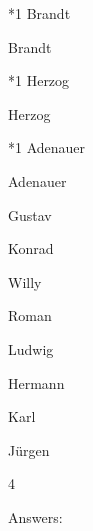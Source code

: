 \documentclass{article}
\newcommand{\presetMatch}{\Q{1}\AddAAKeystroke{event.change=event.change.toUpperCase();}\rectW{\widthof{AA}}}
\begin{document}
\begin{quiz*}{\currQuiz}
\begin{questions}
\begin{rtVW}
\begin{rtVWi}
   \RespBoxTxt[\presets{\presetMatch}\rectW{5mm}\MaxLen{1}]{0}{0}*{1}{} Brandt
   \begin{solution}
        Brandt
\end{solution}
\end{rtVWi}
\begin{rtVWi}
   \RespBoxTxt[\presets{\presetMatch}\rectW{5mm}\MaxLen{1}]{0}{0}*{1}{} Herzog
   \begin{solution}
        Herzog
\end{solution}
\end{rtVWi}
\begin{rtVWi}
   \RespBoxTxt[\presets{\presetMatch}\rectW{5mm}\MaxLen{1}]{0}{0}*{1}{} Adenauer
   \begin{solution}
        Adenauer
\end{solution}
\end{rtVWi}
\eRTVToks
{}
\begin{rtVWi}
   Gustav
\end{rtVWi}
\begin{rtVWi}
   \label{konrad} Konrad
\end{rtVWi}
\begin{rtVWi}
   \label{willy} Willy
\end{rtVWi}
\begin{rtVWi}
   \label{roman} Roman
\end{rtVWi}
\begin{rtVWi}
   Ludwig
\end{rtVWi}
\begin{rtVWi}
   Hermann
\end{rtVWi}
\begin{rtVWi}
   Karl
\end{rtVWi}
\begin{rtVWi}
   J\"{u}rgen
\end{rtVWi}
\eRTVToks
    \begin{multicols}{4}
       \begin{questions}[labelwidthTo={\textbf{A}}]
           \hideCreditMarkup
           \renewcommand{\theeqquestionnoii}{\Alph{eqquestionnoii}}
           \showCreditMarkup
       \end{questions}
    \end{multicols}
    \begin{questions}
       \showCreditMarkup
    \end{questions}
\end{rtVW}
  \eRTVToks
  \displayListRandomly{\thisQuiz}
\end{questions}
\end{quiz*}\cgBdry[1em]\ScoreField{\currQuiz}\olBdry\CorrButton{\currQuiz}\vcgBdry[6pt]

Answers: \AnswerField\currQuiz

\begin{center}
\displaySumryTbl[showmarkup]{\currQuiz}
\end{center}
\end{document}
